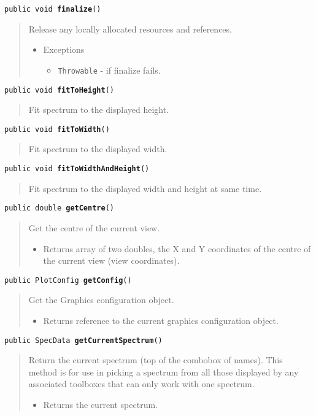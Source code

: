 \documentclass[twoside,11pt,nolof]{starlink}
\providecommand{\method}[1]{\texttt{#1}}
\newenvironment{desc}{\begin{quote}}{\end{quote}}
\begin{document}
\method{public void \textbf{finalize}()\label{l150}\label{l151}}
\begin{desc}Release any locally allocated resources and references.
\begin{itemize}
\item{{Exceptions}
  \begin{itemize}
   \item{\vspace{-.6ex}\texttt{Throwable} - if finalize fails.}
  \end{itemize}
}
\end{itemize}
\end{desc}

\method{public void \textbf{fitToHeight}()\label{l152}\label{l153}}
\begin{desc}Fit spectrum to the displayed height.
\end{desc}

\method{public void \textbf{fitToWidth}()\label{l154}\label{l155}}
\begin{desc}Fit spectrum to the displayed width.
\end{desc}

\method{public void \textbf{fitToWidthAndHeight}()\label{l156}\label{l157}}
\begin{desc}Fit spectrum to the displayed width and height at same time.
\end{desc}

\method{public double \textbf{getCentre}()\label{l158}\label{l159}}
\begin{desc}Get the centre of the current view.
\begin{itemize}
\item{Returns array of two doubles, the X and Y coordinates of the
 centre of the current view (view coordinates). }
\end{itemize}
\end{desc}

\method{public PlotConfig \textbf{getConfig}()\label{l160}\label{l161}}
\begin{desc}Get the Graphics configuration object.
\begin{itemize}
\item{Returns reference to the current graphics configuration object. }
\end{itemize}
\end{desc}

\method{public SpecData \textbf{getCurrentSpectrum}()\label{l162}\label{l163}}
\begin{desc}Return the current spectrum (top of the combobox of names).
 This method is for use in picking a spectrum from all those
 displayed by any associated toolboxes that can only work with
 one spectrum.
\begin{itemize}
\item{Returns the current spectrum. }
\end{itemize}
\end{desc}
\end{document}
